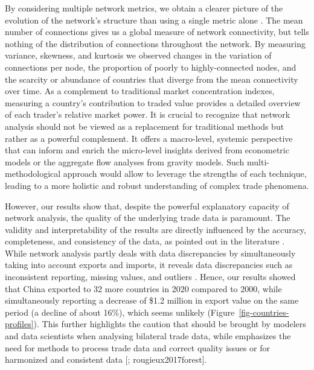\documentclass[
  authoryear,
  review,
  3p]{elsarticle}
\begin{document}
By considering multiple network metrics, we obtain a clearer picture of
the evolution of the network's structure than using a single metric
alone \citep{shanafelt2017yourself, salau2022taking}. The mean number of
connections gives us a global measure of network connectivity, but tells
nothing of the distribution of connections throughout the network. By
measuring variance, skewness, and kurtosis we observed changes in the
variation of connections per node, the proportion of poorly to
highly-connected nodes, and the scarcity or abundance of countries that
diverge from the mean connectivity over time. As a complement to
traditional market concentration indexes, measuring a country's
contribution to traded value provides a detailed overview of each
trader's relative market power. It is crucial to recognize that network
analysis should not be viewed as a replacement for traditional methods
but rather as a powerful complement. It offers a macro-level, systemic
perspective that can inform and enrich the micro-level insights derived
from econometric models or the aggregate flow analyses from gravity
models. Such multi-methodological approach would allow to leverage the
strengths of each technique, leading to a more holistic and robust
understanding of complex trade phenomena.

However, our results show that, despite the powerful explanatory
capacity of network analysis, the quality of the underlying trade data
is paramount. The validity and interpretability of the results are
directly influenced by the accuracy, completeness, and consistency of
the data, as pointed out in the literature
\citep{lovric_social_2018, wang_exploratory_2020, zhou_spatial_2021, huang_static_2024}.
While network analysis partly deals with data discrepancies by
simultaneously taking into account exports and imports, it reveals data
discrepancies such as inconsistent reporting, missing values, and
outliers \citep{kallio2018reliability, chen2022advancing}. Hence, our
results showed that China exported to 32 more countries in 2020 compared
to 2000, while simultaneously reporting a decrease of \$1.2 million in
export value on the same period (a decline of about 16\%), which seems
unlikely (Figure~\ref{fig-countries-profiles}). This further highlights
the caution that should be brought by modelers and data scientists when
analysing bilateral trade data, while emphasizes the need for methods to
process trade data and correct quality issues or for harmonized and
consistent data {[}\citet{CEPII:2010-23}; rougieux2017forest{]}.
\end{document}

